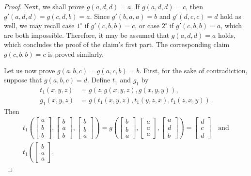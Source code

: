\documentclass[11pt]{amsart}
\theoremstyle{definition}
\theoremstyle{remark}
\theoremstyle{plain}
\begin{document}
\begin{enumerate}[wide, labelindent=0pt]
\begin{enumerate}[wide, labelindent=0pt]
\begin{proof}
Next, we shall prove $g(a,d,d)=a$. If $g(a,d,d)=c$, then $g'(a,d,d)=g(c,d,b)=a$. Since $g'(b,a,a)=b$ and $g'(d,c,c)=d$ hold as well, we may recall case $1^{\circ}$ if $g'(c,b,b)=c$, or case $2^{\circ}$ if $g'(c,b,b)=a$, which are both impossible. Therefore, it may be assumed that $g(a,d,d)=a$ holds, which concludes the proof of the claim's first part. The corresponding claim $g(c,b,b)=c$ is proved similarly.

Let us now prove $g(a,b,c)=g(a,c,b)=b$. First, for the sake of contradiction, suppose that $g(a,b,c)=d$. Define $t_1$ and $g_1$ by 
\begin{align*}
    t_1(x,y,z)&=g(z,g(x,y,z),g(x,y,y)),\\
    g_1(x,y,z)&=g(t_1(x,y,z),t_1(y,z,x),t_1(z,x,y)).
\end{align*}
Then 
$$
\begin{gathered}
t_1\left(
\begin{bmatrix}
a \\
b \\
b
\end{bmatrix}\!,\!
\begin{bmatrix}
b \\
a \\
b
\end{bmatrix}\!,\!
\begin{bmatrix}
b \\
b \\
a
\end{bmatrix}
\right)=
g\left(
\begin{bmatrix}
b \\
b \\
a
\end{bmatrix}\!,\!
\begin{bmatrix}
a \\
a \\
a
\end{bmatrix}\!,\!
\begin{bmatrix}
a \\
d \\
b
\end{bmatrix}
\right)=
\begin{bmatrix}
d \\
c \\
d
\end{bmatrix}\quad\text{and}\\
t_1\left(
\begin{bmatrix}
b \\
a \\
a
\end{bmatrix}\!,\!

\end{gathered}$$
\end{proof}
\end{enumerate}
\end{enumerate}
\end{document}
